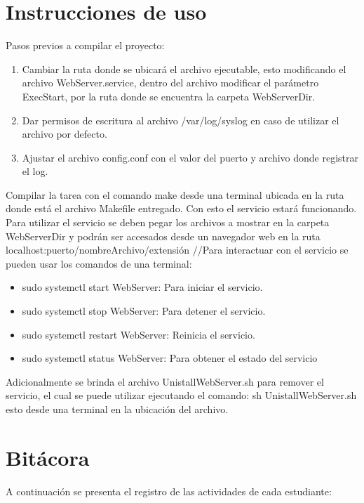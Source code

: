 \documentclass[conference]{IEEEtran}
\begin{document}

\section{Instrucciones de uso}
Pasos previos a compilar el proyecto: 
\begin{enumerate}
    \item Cambiar la ruta donde se ubicará el archivo ejecutable, esto modificando el archivo WebServer.service, dentro del archivo modificar el parámetro ExecStart, por la ruta donde se encuentra la carpeta WebServerDir.
    \item Dar permisos de escritura al archivo /var/log/syslog en caso de utilizar el archivo por defecto.
    \item Ajustar el archivo config.conf con el valor del puerto y archivo donde registrar el log.
\end{enumerate}
Compilar la tarea con el comando make desde una terminal ubicada en la ruta donde está el archivo Makefile entregado. Con esto el servicio estará funcionando.
\\Para utilizar el servicio se deben pegar los archivos a mostrar en la carpeta WebServerDir y podrán ser accesados desde un navegador web en la ruta localhost:puerto/nombreArchivo/extensión
//Para interactuar con el servicio se pueden usar los comandos de una terminal:
\begin{itemize}
    \item sudo systemctl start WebServer: Para iniciar el servicio.
    \item sudo systemctl stop WebServer: Para detener el servicio.
    \item sudo systemctl restart WebServer: Reinicia el servicio.
    \item sudo systemctl status WebServer: Para obtener el estado del servicio
\end{itemize}
Adicionalmente se brinda el archivo UnistallWebServer.sh para remover el servicio, el cual se puede utilizar ejecutando el comando: sh UnistallWebServer.sh esto desde una terminal en la ubicación del archivo.


\section{Bitácora}
A continuación se presenta el registro de las actividades de cada estudiante:
\end{document}
